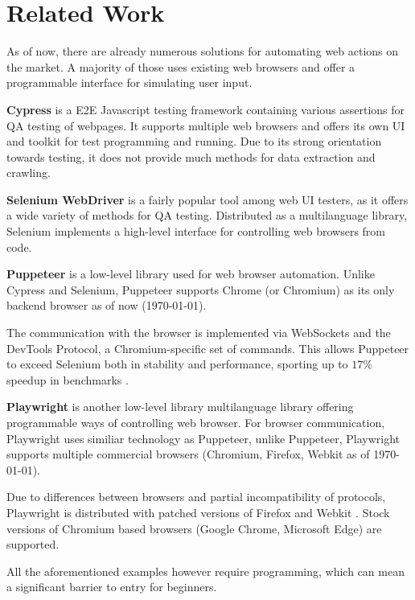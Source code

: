 
\section*{Related Work}
As of now, there are already numerous solutions for automating web actions on the market. 
A majority of those uses existing web browsers and offer a programmable interface for simulating user input.

\textbf{Cypress} is a \ac{E2E} Javascript testing framework containing various assertions for \ac{QA} testing of webpages.
It supports multiple web browsers and offers its own UI and toolkit for test programming and running. 
Due to its strong orientation towards testing, it does not provide much methods for data extraction and crawling.

\textbf{Selenium WebDriver} is a fairly popular tool among web UI testers, as it offers a wide variety of methods for \ac{QA} testing.
Distributed as a multilanguage library, Selenium implements a high-level interface for controlling web browsers from code.

\textbf{Puppeteer} is a low-level library used for web browser automation. 
Unlike Cypress and Selenium, Puppeteer supports Chrome (or Chromium) as its only backend browser as of now (\today).

The communication with the browser is implemented via WebSockets and the DevTools Protocol, a Chromium-specific set of commands.
This allows Puppeteer to exceed Selenium both in stability and performance, sporting up to $17\%$ speedup in benchmarks .

\textbf{Playwright} is another low-level library multilanguage library offering programmable ways of controlling web browser.
For browser communication, Playwright uses similiar technology as Puppeteer, unlike Puppeteer, Playwright supports multiple commercial browsers (Chromium, Firefox, Webkit as of \today).

Due to differences between browsers and partial incompatibility of protocols, Playwright is distributed with patched versions of Firefox and Webkit .
Stock versions of Chromium based browsers (Google Chrome, Microsoft Edge) are supported. 

\vspace{\baselineskip}

All the aforementioned examples however require programming, which can mean a significant barrier to entry for beginners.